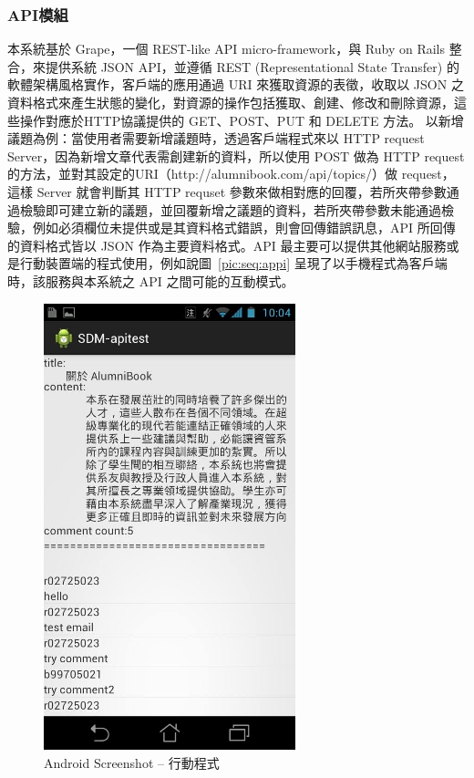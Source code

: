 \begin{minipage}[t]{0.5\textwidth}
\subsubsection{API模組}

本系統基於 Grape，一個 REST-like API micro-framework，與 Ruby on Rails 整合，來提供系統 JSON API，並遵循 REST (Representational State Transfer) 的軟體架構風格實作，客戶端的應用通過 URI 來獲取資源的表徵，收取以 JSON 之資料格式來產生狀態的變化，對資源的操作包括獲取、創建、修改和刪除資源，這些操作對應於HTTP協議提供的 GET、POST、PUT 和 DELETE 方法。 以新增議題為例：當使用者需要新增議題時，透過客戶端程式來以 HTTP request Server，因為新增文章代表需創建新的資料，所以使用 POST 做為 HTTP request 的方法，並對其設定的URI（http://alumnibook.com/api/topics/）做 request，這樣 Server 就會判斷其 HTTP requset 參數來做相對應的回覆，若所夾帶參數通過檢驗即可建立新的議題，並回覆新增之議題的資料，若所夾帶參數未能通過檢驗，例如必須欄位未提供或是其資料格式錯誤，則會回傳錯誤訊息，API 所回傳的資料格式皆以 JSON 作為主要資料格式。API 最主要可以提供其他網站服務或是行動裝置端的程式使用，例如說圖~\ref{pic:seq:appi} 呈現了以手機程式為客戶端時，該服務與本系統之 API 之間可能的互動模式。
\end{minipage}
\begin{minipage}[t]{0.5\textwidth}
\begin{figure}[H]
\centering
\includegraphics[width=0.65\textwidth]{img/prototype/android.jpg}
\caption{Android Screenshot -- 行動程式}
\label{pic:app}
\end{figure}
\end{minipage}

